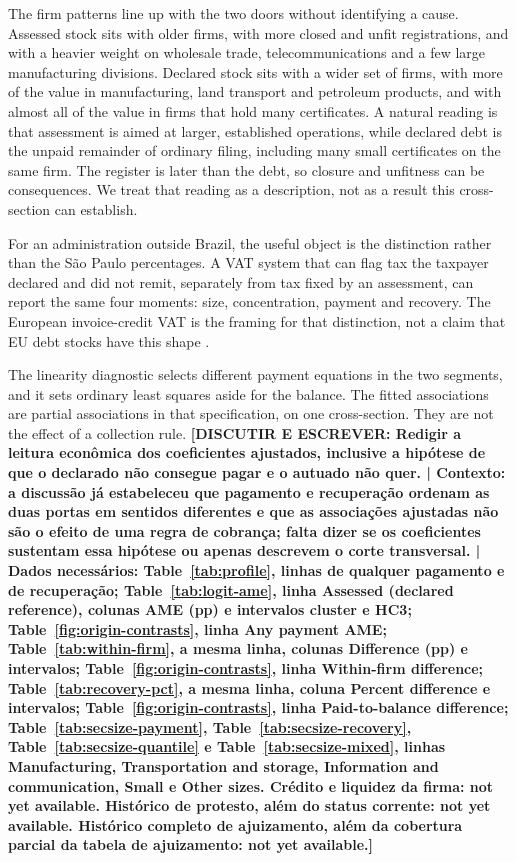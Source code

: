 The firm patterns line up with the two doors without identifying a cause.
Assessed stock sits with older firms, with more closed and unfit registrations, and with a heavier weight on wholesale trade, telecommunications and a few large manufacturing divisions.
Declared stock sits with a wider set of firms, with more of the value in manufacturing, land transport and petroleum products, and with almost all of the value in firms that hold many certificates.
A natural reading is that assessment is aimed at larger, established operations, while declared debt is the unpaid remainder of ordinary filing, including many small certificates on the same firm.
The register is later than the debt, so closure and unfitness can be consequences.
We treat that reading as a description, not as a result this cross-section can establish.

For an administration outside Brazil, the useful object is the distinction rather than the S\~ao Paulo percentages.
A VAT system that can flag tax the taxpayer declared and did not remit, separately from tax fixed by an assessment, can report the same four moments: size, concentration, payment and recovery.
The European invoice-credit VAT is the framing for that distinction, not a claim that EU debt stocks have this shape \citep{keen2006}.

The linearity diagnostic selects different payment equations in the two segments, and it sets ordinary least squares aside for the balance.
The fitted associations are partial associations in that specification, on one cross-section.
They are not the effect of a collection rule.
\textbf{[DISCUTIR E ESCREVER: Redigir a leitura econômica dos coeficientes ajustados, inclusive a hipótese de que o declarado não consegue pagar e o autuado não quer. | Contexto: a discussão já estabeleceu que pagamento e recuperação ordenam as duas portas em sentidos diferentes e que as associações ajustadas não são o efeito de uma regra de cobrança; falta dizer se os coeficientes sustentam essa hipótese ou apenas descrevem o corte transversal. | Dados necessários: Table~\ref{tab:profile}, linhas de qualquer pagamento e de recuperação; Table~\ref{tab:logit-ame}, linha Assessed (declared reference), colunas AME (pp) e intervalos cluster e HC3; Table~\ref{fig:origin-contrasts}, linha Any payment AME; Table~\ref{tab:within-firm}, a mesma linha, colunas Difference (pp) e intervalos; Table~\ref{fig:origin-contrasts}, linha Within-firm difference; Table~\ref{tab:recovery-pct}, a mesma linha, coluna Percent difference e intervalos; Table~\ref{fig:origin-contrasts}, linha Paid-to-balance difference; Table~\ref{tab:secsize-payment}, Table~\ref{tab:secsize-recovery}, Table~\ref{tab:secsize-quantile} e Table~\ref{tab:secsize-mixed}, linhas Manufacturing, Transportation and storage, Information and communication, Small e Other sizes. Crédito e liquidez da firma: not yet available. Histórico de protesto, além do status corrente: not yet available. Histórico completo de ajuizamento, além da cobertura parcial da tabela de ajuizamento: not yet available.]}
